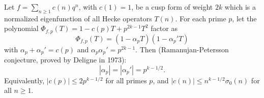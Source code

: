 Let $f = \sum_{n \geq 1} c(n)q^n$, with $c(1) = 1$, be a cusp form of weight $2k$ which is a normalized eigenfunction of all Hecke operators $T(n)$. For each prime $p$, let the polynomial $\Phi_{f,p}(T) = 1 - c(p)T + p^{2k-1}T^2$ factor as
$$\Phi_{f,p}(T) = (1 - \alpha_p T)(1 - \alpha_p' T)$$
with $\alpha_p + \alpha_p' = c(p)$ and $\alpha_p \alpha_p' = p^{2k-1}$. Then (Ramanujan-Petersson conjecture, proved by Deligne in 1973):
$$|\alpha_p| = |\alpha_p'| = p^{k-1/2}.$$
Equivalently, $|c(p)| \leq 2p^{k-1/2}$ for all primes $p$, and $|c(n)| \leq n^{k-1/2} \sigma_0(n)$ for all $n \geq 1$.
